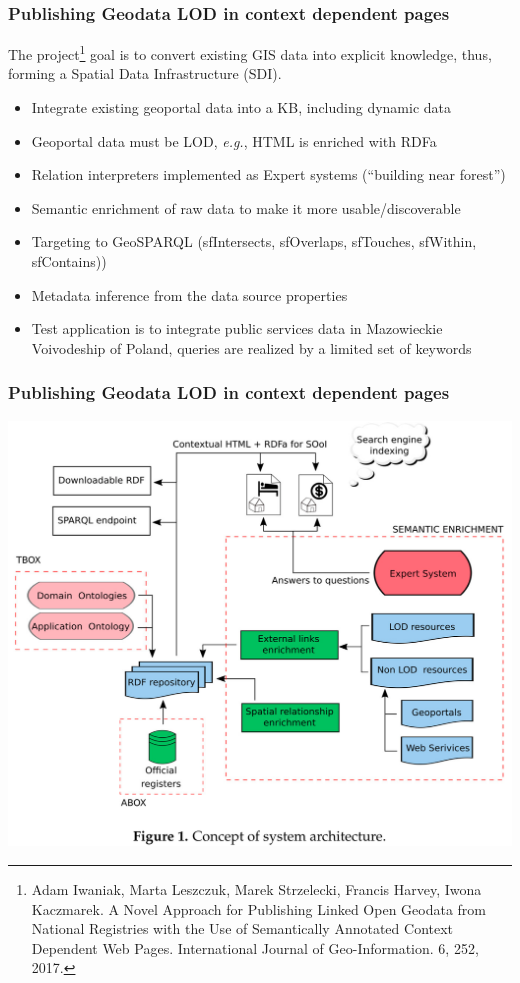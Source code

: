 \documentclass[10pt]{beamer}
\begin{document}
\begin{frame}
  \frametitle{Publishing Geodata LOD in context dependent pages}
  The project\footnote{Adam Iwaniak, Marta Leszczuk, Marek Strzelecki, Francis Harvey, Iwona Kaczmarek. A Novel Approach for Publishing Linked Open Geodata from National Registries with the Use of Semantically Annotated Context Dependent Web Pages. International Journal of Geo-Information. 6, 252, 2017. } goal is to convert existing GIS data into explicit knowledge, thus, forming a Spatial Data Infrastructure (SDI).
  \begin{itemize}
  \item Integrate existing geoportal data into a KB, including dynamic data
  \item Geoportal data must be LOD, \emph{e.g.}, HTML is enriched with RDFa
  \item Relation interpreters implemented as Expert systems (``building near forest'')
  \item Semantic enrichment of raw data to make it more usable/discoverable
  \item Targeting to GeoSPARQL (sfIntersects, sfOverlaps, sfTouches, sfWithin, sfContains))
  \item Metadata inference from the data source properties
  \item Test application is to integrate public services data in Mazowieckie Voivodeship of Poland, queries are realized by a limited set of keywords
  \end{itemize}
\end{frame}

\begin{frame}
  \frametitle{Publishing Geodata LOD in context dependent pages}
  \centering
  \includegraphics[width=0.8\linewidth]{integrating-tech.png}
\end{frame}
\end{document}

